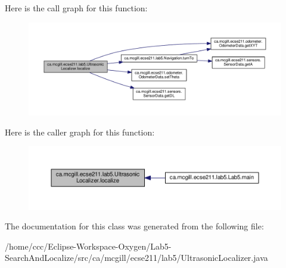 Here is the call graph for this function\+:
\nopagebreak
\begin{figure}[H]
\begin{center}
\leavevmode
\includegraphics[width=350pt]{classca_1_1mcgill_1_1ecse211_1_1lab5_1_1_ultrasonic_localizer_a7fd82ab7240a07ae6947313c0769d4bc_cgraph}
\end{center}
\end{figure}
Here is the caller graph for this function\+:
\nopagebreak
\begin{figure}[H]
\begin{center}
\leavevmode
\includegraphics[width=350pt]{classca_1_1mcgill_1_1ecse211_1_1lab5_1_1_ultrasonic_localizer_a7fd82ab7240a07ae6947313c0769d4bc_icgraph}
\end{center}
\end{figure}


The documentation for this class was generated from the following file\+:\begin{DoxyCompactItemize}
\item 
/home/ccc/\+Eclipse-\/\+Workspace-\/\+Oxygen/\+Lab5-\/\+Search\+And\+Localize/src/ca/mcgill/ecse211/lab5/Ultrasonic\+Localizer.\+java\end{DoxyCompactItemize}
